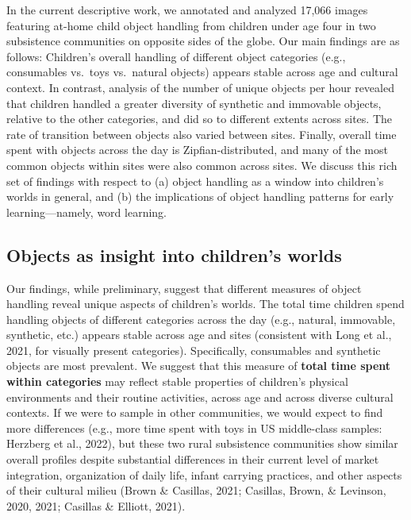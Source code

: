 \documentclass[10pt, letterpaper]{article}
\begin{document}
In the current descriptive work, we annotated and analyzed 17,066 images
featuring at-home child object handling from children under age four in
two subsistence communities on opposite sides of the globe. Our main
findings are as follows: Children's overall handling of different object
categories (e.g., consumables vs.~toys vs.~natural objects) appears
stable across age and cultural context. In contrast, analysis of the
number of unique objects per hour revealed that children handled a
greater diversity of synthetic and immovable objects, relative to the
other categories, and did so to different extents across sites. The rate
of transition between objects also varied between sites. Finally,
overall time spent with objects across the day is Zipfian-distributed,
and many of the most common objects within sites were also common across
sites. We discuss this rich set of findings with respect to (a) object
handling as a window into children's worlds in general, and (b) the
implications of object handling patterns for early learning---namely,
word learning.

\hypertarget{objects-as-insight-into-childrens-worlds}{%
\subsection{Objects as insight into children's
worlds}\label{objects-as-insight-into-childrens-worlds}}

Our findings, while preliminary, suggest that different measures of
object handling reveal unique aspects of children's worlds. The total
time children spend handling objects of different categories across the
day (e.g., natural, immovable, synthetic, etc.) appears stable across
age and sites (consistent with Long et al., 2021, for visually present
categories). Specifically, consumables and synthetic objects are most
prevalent. We suggest that this measure of \textbf{total time spent
within categories} may reflect stable properties of children's physical
environments and their routine activities, across age and across diverse
cultural contexts. If we were to sample in other communities, we would
expect to find more differences (e.g., more time spent with toys in US
middle-class samples: Herzberg et al., 2022), but these two rural
subsistence communities show similar overall profiles despite
substantial differences in their current level of market integration,
organization of daily life, infant carrying practices, and other aspects
of their cultural milieu (Brown \& Casillas, 2021; Casillas, Brown, \&
Levinson, 2020, 2021; Casillas \& Elliott, 2021).
\end{document}
